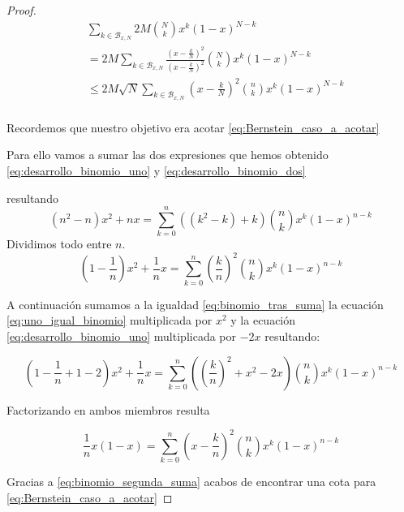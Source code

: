 \begin{proof}
\begin{equation*}  \label{eq:Bernstein_caso_a_acotar}
    \begin{split}
    & \sum_{k \in \mathcal{B}_{x,N}} 2M \binom{N}{k} x^k (1-x) ^{N-k} \\
    & = 2M  \sum_{k \in \mathcal{B}_{x,N}}  \frac{(x- \frac{k}{N})^2}{(x- \frac{k}{N})^2} \binom{N}{k} x^k (1-x) ^{N-k} \\
    & \leq 2M \sqrt{N} \sum_{k \in \mathcal{B}_{x,N}}  (x- \frac{k}{N})^2 \binom{n}{k} x^k (1-x) ^{N-k} \\
\end{split}
\end{equation*}


Recordemos que nuestro objetivo era acotar \ref{eq:Bernstein_caso_a_acotar}

Para ello vamos a sumar las dos expresiones que hemos obtenido
 \eqref{eq:desarrollo_binomio_uno} y \eqref{eq:desarrollo_binomio_dos}

 resultando 
 \begin{equation} 
    (n^2 - n)  x^2 + nx= \sum_{k=0}^{n} ((k^2 - k)+k) \binom{n}{k} x^{k} (1-x)^{n-k}
  \end{equation}
  Dividimos todo entre $n$. 
  \begin{equation} \label{eq:binomio_tras_suma}
    (1 - \frac{1}{n})  x^2 + \frac{1}{n}x= \sum_{k=0}^{n} \left( \frac{k}{n} \right)^2 \binom{n}{k} x^{k} (1-x)^{n-k}
  \end{equation}

  A continuación sumamos a la igualdad \eqref{eq:binomio_tras_suma} la ecuación \eqref{eq:uno_igual_binomio} multiplicada por $x^2$ y la ecuación \eqref{eq:desarrollo_binomio_uno}
  multiplicada por $-2x$ resultando: 


  \begin{equation} 
    (1 - \frac{1}{n} + 1 -2)  x^2 + \frac{1}{n}x= \sum_{k=0}^{n} \left( \left( \frac{k}{n} \right)^2 + x^2 -2x \right) \binom{n}{k} x^{k} (1-x)^{n-k}
  \end{equation}

  Factorizando en ambos miembros resulta

  \begin{equation} \label{eq:binomio_segunda_suma}
     \frac{1}{n} x (1-x)= \sum_{k=0}^{n}  \left( x-\frac{k}{n} \right)^2  \binom{n}{k} x^{k} (1-x)^{n-k}
  \end{equation}

  Gracias a \eqref{eq:binomio_segunda_suma} acabos de encontrar una cota para 
  \eqref{eq:Bernstein_caso_a_acotar}


\end{proof}
